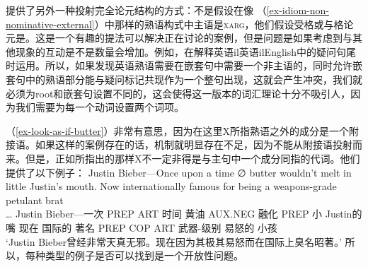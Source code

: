 \citet[\S~6]{KSF2015a}提供了另外一种投射完全论元结构的方式：不是假设在像 （\ref{ex-idiom-non-nominative-external}）中那样的熟语构式中主语是\textsc{xarg}，他们假设受格或与格论元是\xargc。这是一个有趣的提法可以解决正在讨论的案例，但是问题是如果考虑到与其他现象的互动是不是数量会增加。例如，\citet{BF99a}在解释英语il{英语}il{English}中的疑问句尾时运用\xargc。所以，如果发现英语熟语需要在嵌套句中需要一个非主语的\xargc，同时允许嵌套句中的熟语部分能与疑问标记共现作为一个整句出现，这就会产生冲突，我们就必须为root和嵌套句设置不同的\xargc，这会使得这一版本的词汇理论十分不吸引人，因为我们需要为每一个动词设置两个词项。

（\ref{ex-look-as-if-butter}）非常有意思，因为在这里X所指熟语之外的成分是一个附接语。如果这样的案例存在的话，\xargc 机制就明显存在不足，因为\xargc 不能从附接语投射而来。但是，正如\citet{KSF2015a}所指出的那样X不一定非得是与主句中一个成分同指的代词。他们提供了以下例子：
\ea
\gll Justin Bieber—Once upon a time ∅ butter wouldn't melt in little Justin's mouth. Now internationally famous for being a weapons-grade petulant brat\\    \ldots
     Justin Bieber—一次 PREP ART 时间 黄油 AUX.NEG 融化 PREP 小 Justin的 嘴 现在 国际的 著名 PREP COP ART 武器-级别 易怒的 小孩\\
\glt `Justin Bieber曾经非常天真无邪。现在因为其极其易怒而在国际上臭名昭著。'
\z
所以，每种类型的例子是否可以找到是一个开放性问题。

